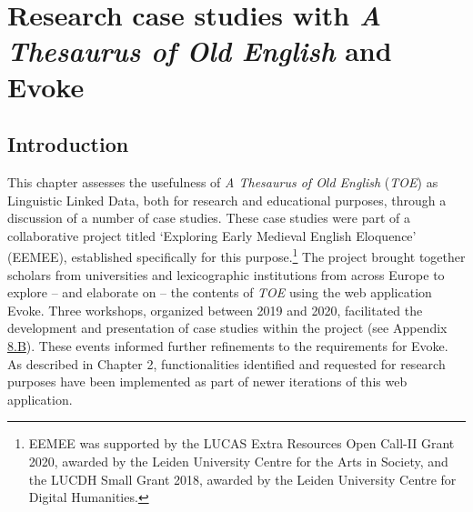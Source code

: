 

\setcounter{chapter}{7} %
\chapter{Research case studies with \textit{A Thesaurus of Old English} and Evoke}


\section{Introduction}

This chapter assesses the usefulness of \textit{A Thesaurus of Old English} (\textit{TOE}) as Linguistic Linked Data, both for research and educational purposes, through a discussion of a number of case studies. These case studies were part of a collaborative project titled `Exploring Early Medieval English Eloquence' (EEMEE), established specifically for this purpose.\footnote{EEMEE was supported by the LUCAS Extra Resources Open Call-II Grant 2020, awarded by the Leiden University Centre for the Arts in Society, and the LUCDH Small Grant 2018, awarded by the Leiden University Centre for Digital Humanities.} The project brought together scholars from universities and lexicographic institutions from across Europe to explore -- and elaborate on -- the contents of \textit{TOE} using the web application Evoke. Three workshops, organized between 2019 and 2020, facilitated the development and presentation of case studies within the project (see Appendix \hyperref[Appendix8.B]{8.B}). These events informed further refinements to the requirements for Evoke. As described in Chapter 2, functionalities identified and requested for research purposes have been implemented as part of newer iterations of this web application.

